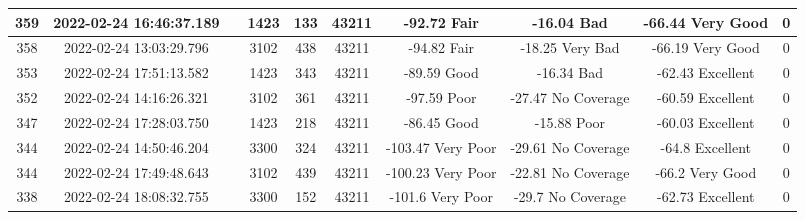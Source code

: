 \begin{longtable*}{|c|c|c|c|c|c|c|c|c|c|}
359&2022-02-24 16:46:37.189&&1423&133&43211& -92.72    Fair        & -16.04    Bad         & -66.44    Very Good   & 0\\\hline
{}358&2022-02-24 13:03:29.796&&3102&438&43211& -94.82    Fair        & -18.25    Very Bad    & -66.19    Very Good   & 0\\\hline
{}353&2022-02-24 17:51:13.582&&1423&343&43211& -89.59    Good        & -16.34    Bad         & -62.43    Excellent   & 0\\\hline
{}352&2022-02-24 14:16:26.321&&3102&361&43211& -97.59    Poor        & -27.47    No Coverage & -60.59    Excellent   & 0\\\hline
{}347&2022-02-24 17:28:03.750&&1423&218&43211& -86.45    Good        & -15.88    Poor        & -60.03    Excellent   & 0\\\hline
{}344&2022-02-24 14:50:46.204&&3300&324&43211& -103.47   Very Poor   & -29.61    No Coverage & -64.8     Excellent   & 0\\\hline
{}344&2022-02-24 17:49:48.643&&3102&439&43211& -100.23   Very Poor   & -22.81    No Coverage & -66.2     Very Good   & 0\\\hline
{}338&2022-02-24 18:08:32.755&&3300&152&43211& -101.6    Very Poor   & -29.7     No Coverage & -62.73    Excellent   & 0\\\hline

\end{longtable*}
